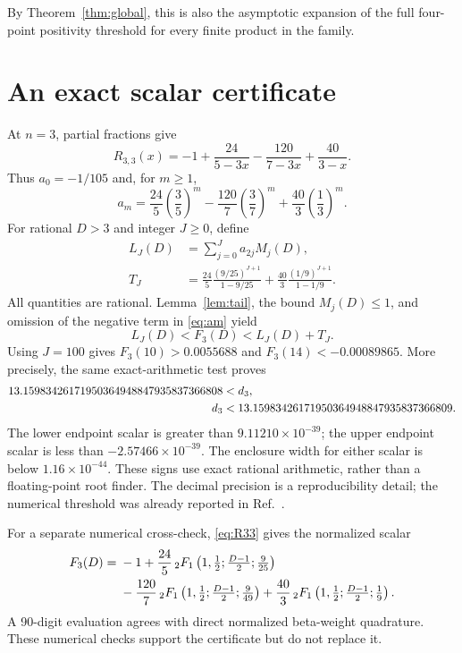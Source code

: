 \documentclass[11pt,a4paper]{article}
\theoremstyle{remark}\newtheorem{remark}[theorem]{Remark}
\begin{document}
By Theorem~\ref{thm:global}, this is also the asymptotic expansion of the full four-point positivity threshold for every finite product in the family.

\section{An exact scalar certificate}\label{sec:scalarcertificate}
At $n=3$, partial fractions give
\begin{equation}\label{eq:R33}
 R_{3,3}(x)=-1+\frac{24}{5-3x}-\frac{120}{7-3x}+\frac{40}{3-x}.
\end{equation}
Thus $a_0=-1/105$ and, for $m\geq1$,
\begin{equation}\label{eq:am}
 a_m=\frac{24}{5}\left(\frac35\right)^m
 -\frac{120}{7}\left(\frac37\right)^m
 +\frac{40}{3}\left(\frac13\right)^m.
\end{equation}
For rational $D>3$ and integer $J\geq0$, define
\begin{align}
 L_J(D)&=\sum_{j=0}^{J}a_{2j}M_j(D),\\
 T_J&=\frac{24}{5}\frac{(9/25)^{J+1}}{1-9/25}
       +\frac{40}{3}\frac{(1/9)^{J+1}}{1-1/9}.
\end{align}
All quantities are rational. Lemma~\ref{lem:tail}, the bound $M_j(D)\leq1$, and omission of the negative term in \eqref{eq:am} yield
\begin{equation}\label{eq:interval}
 L_J(D)<F_3(D)<L_J(D)+T_J.
\end{equation}
Using $J=100$ gives $F_3(10)>0.0055688$ and $F_3(14)<-0.00089865$. More precisely, the same exact-arithmetic test proves
\begin{align}\label{eq:bracket}
 13.15983426171950364948847935837366808&<d_3,\\
 d_3&<13.15983426171950364948847935837366809.\notag
\end{align}
The lower endpoint scalar is greater than $9.11210\times10^{-39}$; the upper endpoint scalar is less than $-2.57466\times10^{-39}$. The enclosure width for either scalar is below $1.16\times10^{-44}$. These signs use exact rational arithmetic, rather than a floating-point root finder. The decimal precision is a reproducibility detail; the numerical threshold was already reported in Ref.~\cite{Shao}.

For a separate numerical cross-check, \eqref{eq:R33} gives the normalized scalar
\begin{align}
 F_3(D)={}&-1+\frac{24}{5}\,{}_2F_1\left(1,\tfrac12;\tfrac{D-1}{2};\tfrac9{25}\right)\notag\\
 &-\frac{120}{7}\,{}_2F_1\left(1,\tfrac12;\tfrac{D-1}{2};\tfrac9{49}\right)
 +\frac{40}{3}\,{}_2F_1\left(1,\tfrac12;\tfrac{D-1}{2};\tfrac19\right).
\end{align}
A 90-digit evaluation agrees with direct normalized beta-weight quadrature. These numerical checks support the certificate but do not replace it.
\end{document}
